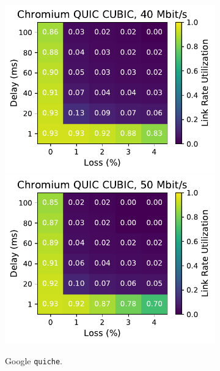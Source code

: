 \begin{figure}[ht]
\begin{subfigure}[b]{0.22\linewidth}
        \includegraphics[width=\linewidth,trim={0 0 2cm 0},clip]{splitting/figures/heatmaps/heatmap_quic_cubic_40mbps.pdf}
        \includegraphics[width=\linewidth,trim={0 0 2cm 0},clip]{splitting/figures/heatmaps/heatmap_quic_cubic_50mbps.pdf}
        \caption{Google \texttt{quiche}.}
    \end{subfigure}
    \begin{subfigure}[b]{0.22\linewidth}

\end{subfigure}
\end{figure}
